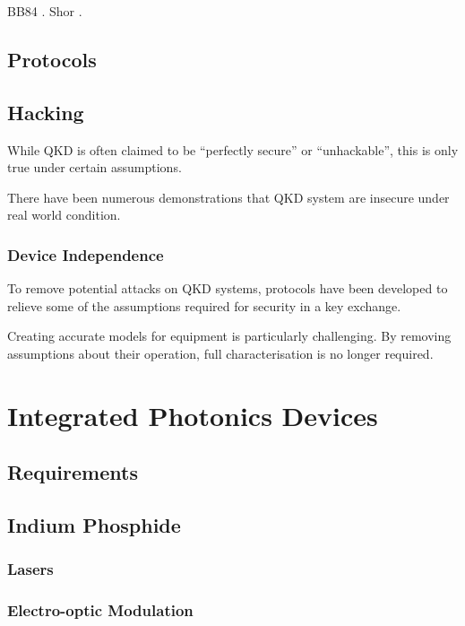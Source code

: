 BB84 \cite{BB84}. Shor \cite{shor1994}.

\subsection{Protocols}

\subsection{Hacking}

While \ac{QKD} is often claimed to be ``perfectly secure'' or ``unhackable'', this is only true under certain assumptions. 

There have been numerous demonstrations that \ac{QKD} system are insecure under real world condition.

\subsubsection*{Device Independence}

To remove potential attacks on \ac{QKD} systems, protocols have been developed to relieve some of the assumptions required for security in a key exchange. 

Creating accurate models for equipment is particularly challenging. By removing assumptions about their operation, full characterisation is no longer required.

\section{Integrated Photonics Devices}

\subsection{Requirements}

\subsection{Indium Phosphide}

\subsubsection*{Lasers}

\subsubsection*{Electro-optic Modulation}

